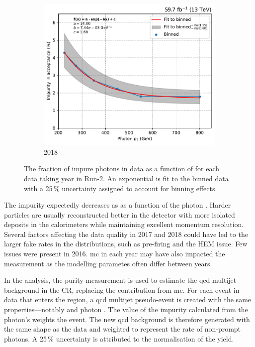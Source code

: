 \begin{figure}[htbp]
    \hfill
    \begin{subfigure}[b]{0.32\textwidth}
        \includegraphics[width=\textwidth]{figures/photon_purity/2018/impurity_plot_2018.pdf}
        \caption{2018}
    \end{subfigure}
    \caption[The fraction of impure photons in data as a function of \pt for each data taking year in Run-2]{The fraction of impure photons in data as a function of \pt for each data taking year in Run-2. An exponential is fit to the binned data with a 25\,\% uncertainty assigned to account for binning effects.}
    \label{fig:htoinv_photon_impurity}
\end{figure}


The impurity expectedly decreases as as a function of the photon \pt. Harder particles are usually reconstructed better in the detector with more isolated deposits in the calorimeters while maintaining excellent momentum resolution. Several factors affecting the data quality in 2017 and 2018 could have led to the larger fake rates in the distributions, such as pre-firing and the HEM issue. Few issues were present in 2016. \acrlong{mc} in each year may have also impacted the measurement as the modelling parametes often differ between years.

In the analysis, the purity measurement is used to estimate the \acrshort{qcd} multijet background in the \singlePhotonCr \gls{CR}, replacing the contribution from \acrshort{mc}. For each event in data that enters the region, a \acrshort{qcd} multijet pseudo-event is created with the same properties---notably \ptmiss and photon \pt. The value of the impurity calculated from the photon's \pt weights the event. The new \acrshort{qcd} background is therefore generated with the same shape as the data and weighted to represent the rate of non-prompt photons. A 25\,\% uncertainty is attributed to the normalisation of the yield.

